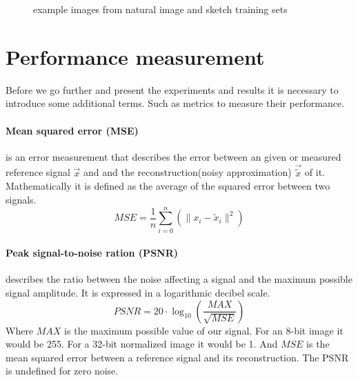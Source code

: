 \begin{figure}[h]
\hspace{5mm}
\hspace{5mm}
\caption{example images from natural image and sketch training sets}
\label{fig:database_images}
\end{figure}

\section{Performance measurement}
Before we go further and present the experiments and results it is necessary to
introduce some additional terms. Such as metrics to measure their performance.

\paragraph{Mean squared error (MSE)} is an error measurement that
describes the error between an given or measured reference signal $\vec{x}$
and and the reconstruction(noisy approximation) $\vec{\tilde{x}}$ of it.
Mathematically it is defined as the average of the squared error between two
signals.
\begin{equation*}
 MSE = \frac{1}{n} \sum_{i=0}^{n} \left( {\lVert x_i -
\tilde{x}_i\rVert^{2}}\right)
\end{equation*}

\paragraph{Peak signal-to-noise ration (PSNR)} describes the ratio between the
noise affecting a signal and the maximum possible signal amplitude. It is
expressed in a logarithmic decibel scale.
\begin{equation*}
 PSNR = 20 \cdot \log_{10} \left(\frac{MAX}{\sqrt{MSE}}\right)
\end{equation*}
Where $MAX$ is the maximum possible value of our signal. For an 8-bit
image it would be 255. For a 32-bit normalized image it would be 1. And $MSE$ is
the mean squared error between a reference signal and its reconstruction. The
PSNR is undefined for zero noise.

